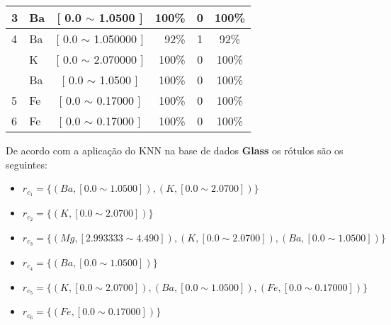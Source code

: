 \begin{table}[!h]
{\begin{tabular}{llcrcc}
\multirow{-3}{*}{3}                          & Ba    & [ 0.0 $\sim$  1.0500     ]      & 100\%                               & 0 &  100\% \\  \hline
4                                           & Ba    & [ 0.0 $\sim$ 1.050000    ]       & 92\%                               & 1 &  92\%\\  \hline                                            
                                            & K     & [ 0.0 $\sim$  2.070000     ]       & 100\%                               & 0 & 100\%\\  
                                            & Ba    & [ 0.0 $\sim$  1.0500     ]       & 100\%                               & 0 & 100\% \\   
\multirow{-3}{*}{5}                         & Fe    & [ 0.0 $\sim$  0.17000     ]       & 100\%                               & 0 & 100\% \\  \hline
6                                           & Fe    & [ 0.0 $\sim$  0.17000     ]       & 100\%                               & 0 & 100\% \\  \hline

\hline

\end{tabular}
}
\end{table}

De acordo com a aplicação do KNN na base de dados \textbf{Glass} os rótulos são os seguintes:
\begin{itemize}[noitemsep]
 \item ${r_{c_1}=\{ (Ba,[ 0.0 \sim 1.0500 ] ), (K,[ 0.0 \sim  2.0700 ] )\} }$
 \item ${r_{c_2}=\{(K,[ 0.0 \sim  2.0700 ] ) \} }$
 \item ${r_{c_3}=\{ (Mg, [ 2.993333 \sim  4.490]), (K,[ 0.0 \sim  2.0700 ] ), (Ba,[ 0.0 \sim 1.0500 ] )  \} }$  
 \item ${r_{c_4}=\{ (Ba,[ 0.0 \sim 1.0500 ] ) \}}$
 \item ${r_{c_5}=\{ (K,[ 0.0 \sim  2.0700 ] ), (Ba,[ 0.0 \sim 1.0500 ] ), (Fe,[ 0.0 \sim 0.17000] ) \} }$
 \item ${r_{c_6}=\{ (Fe,[ 0.0 \sim 0.17000] ) \} }$
\end{itemize}


